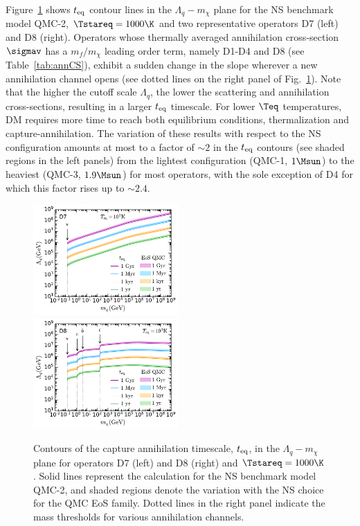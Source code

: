 Figure~\ref{fig:ann_xs_plots} shows $t_{\rm eq}$ contour lines in the $\Lambda_q-m_\chi$ plane for the NS benchmark model QMC-2, $\Tstareq=1000\K$ and two representative operators D7 (left) and D8 (right). 
Operators whose thermally averaged annihilation cross-section $\sigmav$ has a  $m_f/m_\chi$ leading order term, namely D1-D4 and D8 (see Table~\ref{tab:annCS}), exhibit a sudden change in the slope wherever a new annihilation channel opens (see dotted lines on the right panel of Fig.~\ref{fig:ann_xs_plots}). Note that the higher the cutoff scale $\Lambda_q$, the lower the scattering and annihilation cross-sections, resulting in a larger $t_{\rm eq}$ timescale. For lower $\Teq$ temperatures, DM requires more time to reach both equilibrium conditions, thermalization and capture-annihilation. The variation of these results with respect to the NS configuration amounts at most to a factor of $\sim2$ in the $t_{\rm eq}$ contours (see shaded regions in the left panels) from the lightest configuration (QMC-1, $1\Msun$) to the heaviest (QMC-3, $1.9\Msun$) for most operators, with the sole exception of D4 for which this factor rises up to $\sim 2.4$. 

\begin{figure}
    \centering
    \includegraphics[width = 0.496\textwidth]{D7_Lambda_mdm_teq.pdf}
    \includegraphics[width = 0.496\textwidth]{D8_Lambda_mdm_teq.pdf}    
    \caption{
    Contours of the capture annihilation timescale, $t_{\rm eq}$,  in the $\Lambda_q-m_\chi$ plane for operators D7 (left) and D8 (right) and $\Tstareq=1000\K$. 
    Solid lines represent the calculation for the NS benchmark model QMC-2, and shaded regions denote the variation with the NS choice for the QMC EoS family. 
    Dotted lines in the right panel indicate the mass thresholds for various annihilation channels.  
    }
    \label{fig:ann_xs_plots}
\end{figure}


